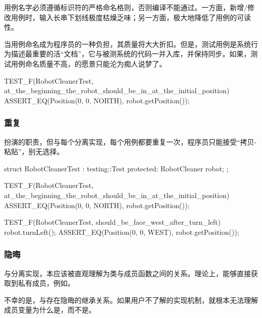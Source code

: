 \begin{content}
用例名字必须遵循标识符的严格命名格则，否则编译不能通过。一方面，新增/修改用例时，输入长串下划线极度枯燥乏味；另一方面，极大地降低了用例的可读性。

当用例命名成为程序员的一种负担，其质量将大大折扣。但是，测试用例是系统行为描述最重要的活“文档”，它与被测系统的代码一并入库，并保持同步。如果，测试用例命名质量不高，的愿景只能沦为痴人说梦了。

\begin{leftbar}
 \begin{c++}
TEST_F(RobotCleanerTest, at_the_beginning_the_robot_should_be_in_at_the_initial_position) {
  ASSERT_EQ(Position(0, 0, NORTH), robot.getPosition());
}
 \end{c++}
\end{leftbar}

\subsubsection{重复}

扮演的职责，但与每个分离实现，每个用例都要重复一次，程序员只能接受“拷贝-粘贴”，别无选择。

\begin{leftbar}
 \begin{c++}
struct RobotCleanerTest : testing::Test {
protected:
  RobotCleaner robot;
};
 
TEST_F(RobotCleanerTest, at_the_beginning_the_robot_should_be_in_at_the_initial_position) {
  ASSERT_EQ(Position(0, 0, NORTH), robot.getPosition());
}
 
TEST_F(RobotCleanerTest, should_be_face_west_after_turn_left) {
  robot.turnLeft();
  ASSERT_EQ(Position(0, 0, WEST), robot.getPosition());
}
  \end{c++}
\end{leftbar}

\subsubsection{隐晦}

与分离实现，本应该被直观理解为类与成员函数之间的关系。理论上，能够直接获取到私有成员，例如。

不幸的是，与存在隐晦的继承关系。如果用户不了解的实现机制，就根本无法理解成员变量为什么是，而不是。


\end{content}
